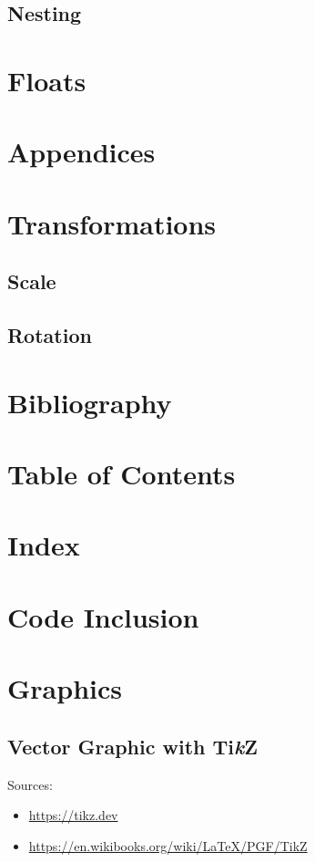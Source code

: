\subsection{Nesting}

\section{Floats}

\section{Appendices}

\section{Transformations}
\subsection{Scale}
\subsection{Rotation}

\section{Bibliography}
\section{Table of Contents}
\section{Index}

\section{Code Inclusion}

\section{Graphics}
\subsection{Vector Graphic with Ti\textit{k}Z}

Sources:
\begin{itemize}
  \item \url{https://tikz.dev}
  \item \url{https://en.wikibooks.org/wiki/LaTeX/PGF/TikZ}
\end{itemize}

